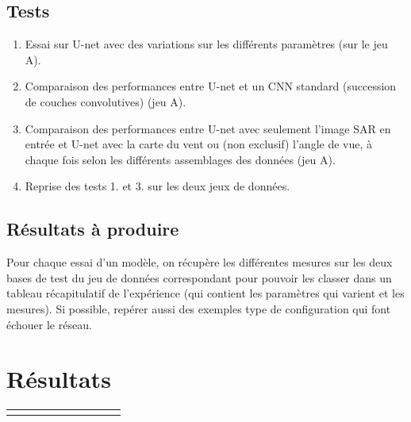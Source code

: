 \documentclass{article}
\begin{document}
\subsection{Tests}

\begin{enumerate}
\item Essai sur U-net avec des variations sur les différents paramètres (sur le jeu A).
\item Comparaison des performances entre U-net et un CNN standard (succession de couches convolutives) (jeu A).
\item Comparaison des performances entre U-net avec seulement l'image SAR en entrée et U-net avec la carte du vent ou (non exclusif) l'angle de vue, à chaque fois selon les différents assemblages des données (jeu A).
\item Reprise des tests 1. et 3. sur les deux jeux de données.
\end{enumerate}

\subsection{Résultats à produire}
Pour chaque essai d'un modèle, on récupère les différentes mesures sur les deux bases de test du jeu de données correspondant pour pouvoir les classer dans un tableau récapitulatif de l'expérience (qui contient les paramètres qui varient et les mesures).
Si possible, repérer aussi des exemples type de configuration qui font échouer le réseau.

\section{Résultats}

\begin{tabular}{|l | l | l | l | l | l | l | l | l |}
  \hline \\
  
\end{tabular}
\end{document}
